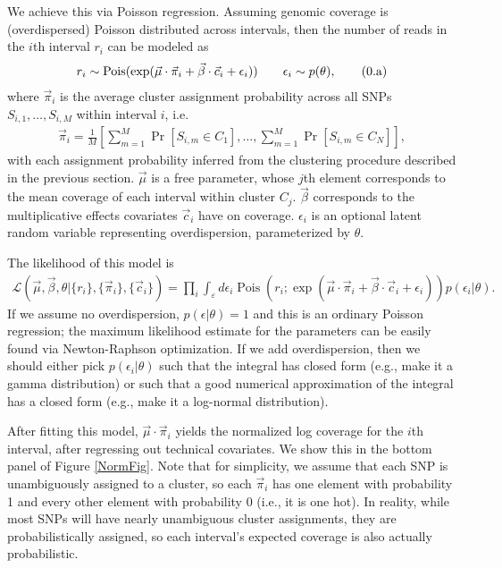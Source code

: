 \documentclass[10pt,letter]{article}
\numberwithin{equation}{section}
\newcommand{\rt}{\right}
\newcommand{\lt}{\left}
\newcommand{\btag}[1]{\addtocounter{equation}{1}\label{#1}\tag{\arabic{section}.\alph{equation}}}
\newcommand{\textop}[1]{\operatorname{#1}}
\begin{document}
We achieve this via Poisson regression. Assuming genomic coverage is (overdispersed) Poisson distributed across intervals, then the number of reads in the $i$th interval $r_i$ can be modeled as
\begin{align*}
r_i \sim \textop{Pois}(\exp(\vec\mu\cdot\vec \pi_i + \vec\beta\cdot\vec c_i + \epsilon_i))\qquad \epsilon_i\sim p(\theta),\btag{poiss0}
\end{align*}
where $\vec\pi_i$ is the average cluster assignment probability across all SNPs $S_{i,1},\dots,S_{i,M}$ within interval $i$, i.e.
\begin{align*}
\vec \pi_i=\frac{1}{M}\lt[\sum_{m=1}^M\textop{Pr}[S_{i,m}\in C_1],\dots,\sum_{m=1}^M\textop{Pr}[S_{i,m}\in C_N]\rt],
\end{align*}
with each assignment probability inferred from the clustering procedure described in the previous section. $\vec\mu$ is a free parameter, whose $j$th element corresponds to the mean coverage of each interval within cluster $C_j$. $\vec\beta$ corresponds to the multiplicative effects covariates $\vec c_i$ have on coverage. $\epsilon_i$ is an optional latent random variable representing overdispersion, parameterized by $\theta$.

The likelihood of this model is
\begin{align*}
\mathcal{L}(\vec \mu,\vec\beta,\theta|\{r_i\},\{\vec \pi_i\},\{\vec c_i\}) = \prod_i \int_{\varepsilon} d\epsilon_i \textop{Pois}(r_i;\exp(\vec\mu\cdot\vec \pi_i + \vec\beta\cdot\vec c_i + \epsilon_i))p(\epsilon_i|\theta).
\end{align*}
If we assume no overdispersion, $p(\epsilon|\theta)=1$ and this is an ordinary Poisson regression; the maximum likelihood estimate for the parameters can be easily found via Newton-Raphson optimization. If we add overdispersion, then we should either pick $p(\epsilon_i|\theta)$ such that the integral has closed form (e.g., make it a gamma distribution) or such that a good numerical approximation of the integral has a closed form (e.g., make it a log-normal distribution).

After fitting this model, $\vec\mu\cdot\vec\pi_i$ yields the normalized log coverage for the $i$th interval, after regressing out technical covariates. We show this in the bottom panel of Figure \ref{NormFig}. Note that for simplicity, we assume that each SNP is unambiguously assigned to a cluster, so each $\vec\pi_i$ has one element with probability 1 and every other element with probability 0 (i.e., it is one hot). In reality, while most SNPs will have nearly unambiguous cluster assignments, they are probabilistically assigned, so each interval's expected coverage is also actually probabilistic.
\end{document}
